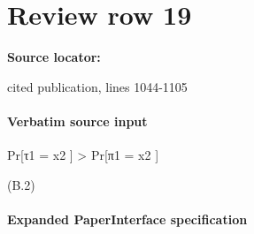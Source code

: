 \documentclass[10pt]{article}
\begin{document}
\section*{Review row 19}
\textbf{Source locator:} {\footnotesize\raggedright cited publication, lines 1044-\allowbreak{}1105\par}
\paragraph{Verbatim source input}
\begin{ReviewVerbatim}
Pr[τ1 = x2 ] > Pr[π1 = x2 ]

(B.2)
\end{ReviewVerbatim}



\paragraph{Expanded PaperInterface specification}
\end{document}
